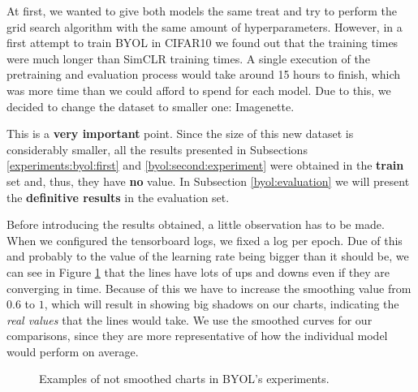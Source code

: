 At first, we wanted to give both models the same treat and try to perform the grid search algorithm with the same amount of hyperparameters. However, in a first attempt to train BYOL in CIFAR10 we found out that the training times were much longer than SimCLR training times. A single execution of the pretraining and evaluation process would take around 15 hours to finish, which was more time than we could afford to spend for each model. Due to this, we decided to change the dataset to smaller one: Imagenette.


\begin{remark}
  This is a \textbf{very important} point. Since the size of this new dataset is considerably smaller, all the results presented in  Subsections \ref{experiments:byol:first} and \ref{byol:second:experiment} were obtained in the \textbf{train} set and, thus, they have \textbf{no} value. In Subsection \ref{byol:evaluation} we will present the \textbf{definitive results} in the evaluation set.
\end{remark}



Before introducing the results obtained, a little observation has to be made. When we configured the tensorboard logs, we fixed a log per epoch. Due of this and probably to the value of the learning rate being bigger than it should be, we can see in Figure \ref{fig:byol:not:smoothed} that the lines have lots of ups and downs even if they are converging in time. Because of this we have to increase the smoothing value from $0.6$ to $1$, which will result in showing big shadows on our charts, indicating the \emph{real values} that the lines would take. We use the smoothed curves for our comparisons, since they are more representative of how the individual model would perform on average.


\begin{figure}[htp] 
    \centering
    \hfill%
        \caption{Examples of not smoothed charts in BYOL's experiments. }
        \label{fig:byol:not:smoothed}
\end{figure}

